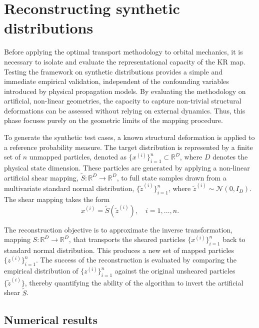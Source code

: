 \section{Reconstructing synthetic distributions} \label{sec:synthetic_distributions}

Before applying the optimal transport methodology to orbital mechanics, it is necessary to isolate and evaluate the representational capacity of the KR map. Testing the framework on synthetic distributions provides a simple and immediate empirical validation, independent of the confounding variables introduced by physical propagation models. By evaluating the methodology on artificial, non-linear geometries, the capacity to capture non-trivial structural deformations can be assessed without relying on external dynamics. Thus, this phase focuses purely on the geometric limits of the mapping procedure.

To generate the synthetic test cases, a known structural deformation is applied to a reference probability measure. The target distribution is represented by a finite set of $n$ unmapped particles, denoted as $\{x^{(i)}\}_{i=1}^n \subset \mathbb{R}^D$, where $D$ denotes the physical state dimension. These particles are generated by applying a non-linear artificial shear mapping, $\tilde{S}: \mathbb{R}^D \to \mathbb{R}^D$, to full state samples drawn from a multivariate standard normal distribution, $\{\tilde{z}^{(i)}\}_{i=1}^n$, where $\tilde{z}^{(i)} \sim \mathcal{N}(0, I_D)$. The shear mapping takes the form
\begin{equation*}
    x^{(i)} = \tilde{S} \left( \tilde{z}^{(i)} \right), \quad i = 1, \dots, n.
\end{equation*}

The reconstruction objective is to approximate the inverse transformation, mapping $S : \mathbb{R}^D \to \mathbb{R}^D$, that transports the sheared particles $\{x^{(i)}\}_{i=1}^n$ back to standard normal distribution. This produces a new set of mapped particles $\{z^{(i)}\}_{i=1}^n$. The success of the reconstruction is evaluated by comparing the empirical distribution of $\{z^{(i)}\}_{i=1}^n$ against the original unsheared particles $\{\tilde{z}^{(i)}\}$, thereby quantifying the ability of the algorithm to invert the artificial shear $\tilde{S}$.

\subsection{Numerical results} \label{subsec:synthetic_results}


